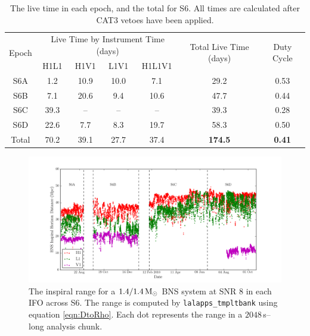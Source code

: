 \begin{table}[hbtp]
\center
\begin{tabular}{| c | c | c | c | c | c | c |}
\hline
\multirow{2}{*}{Epoch}   &  \multicolumn{4}{|c|}{Live Time by Instrument Time (days)}  &   \multirow{2}{*}{\parbox{2.3cm}{Total Live Time (days)}}  &    \multirow{2}{*}{Duty Cycle} \\
\cline{2-5}
    &  H1L1  &   H1V1   &   L1V1   &     H1L1V1 &   &   \\
\hline \hline
S6A     &   1.2 &   10.9    &   10.0    &   7.1  &   29.2    &   0.53 \\
\hline
S6B     &   7.1 &   20.6    &   9.4     &  10.6  &   47.7    &   0.44 \\
\hline
S6C     &   39.3    &   --  &   --      &   --   &   39.3    &   0.28 \\
\hline
S6D     &   22.6    &   7.7 &   8.3     &   19.7 &   58.3    &   0.50 \\
\hline \hline
Total   &   70.2    &   39.1 &  27.7    &   37.4 &   \textbf{174.5}   &   \textbf{0.41} \\
\hline
\end{tabular}
\caption{The live time in each epoch, and the total for S6. All times are calculated after CAT3 vetoes have been applied.}
\label{tab:s6-livetimes}
\end{table}

\begin{landscape}
\begin{figure}[p]
\begin{center}
\includegraphics[width=9in]{figures/s6-hzrange_v_time.png}
\end{center}
\caption{The inspiral range for a $1.4/1.4\,\mathrm{M_\odot}$ \ac{BNS} system at \ac{SNR} $8$ in each \ac{IFO} across \ac{S6}. The range is computed by \texttt{lalapps\_tmpltbank} using equation \ref{eqn:DtoRho}. Each dot represents the range in a $2048\,$s--long analysis chunk.}
\label{fig:s6_insprange_v_time}
\end{figure}
\end{landscape}

